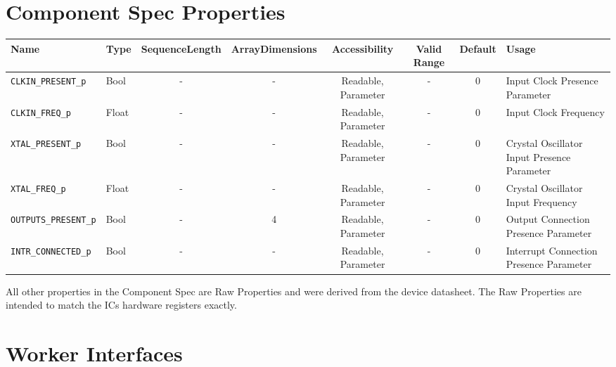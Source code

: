 \documentclass{article}
\begin{document}
\begin{landscape}
\section*{Component Spec Properties}
	\begin{scriptsize}
		\begin{tabular}{|p{3cm}|p{1.5cm}|c|c|c|c|c|p{7cm}|}
			\hline
			\rowcolor{blue}
			Name                   	& Type  & SequenceLength & ArrayDimensions & Accessibility       & Valid Range & Default & Usage                        				\\
			\hline
			\verb+CLKIN_PRESENT_p+ 	& Bool 	& -              & -               & Readable, Parameter & -           & 0       & Input Clock Presence Parameter				\\
			\hline
			\verb+CLKIN_FREQ_p+    	& Float & -              & -               & Readable, Parameter & -           & 0       & Input Clock Frequency						\\
			\hline
			\verb+XTAL_PRESENT_p+  	& Bool  & -              & -               & Readable, Parameter & -           & 0       & Crystal Oscillator Input Presence Parameter	\\
			\hline
			\verb+XTAL_FREQ_p+     	& Float	& -              & -               & Readable, Parameter & -           & 0       & Crystal Oscillator Input Frequency			\\
			\hline
			\verb+OUTPUTS_PRESENT_p+& Bool 	& -              & 4               & Readable, Parameter & -           & 0       & Output Connection Presence Parameter			\\
			\hline
			\verb+INTR_CONNECTED_p+ & Bool 	& -              & -               & Readable, Parameter & -           & 0       & Interrupt Connection Presence Parameter		\\
			\hline
		\end{tabular}
	\end{scriptsize}
	\par\medskip\noindent All other properties in the Component Spec are Raw Properties and were derived from the device datasheet\cite{datasheet}. The Raw Properties are intended to match the ICs hardware registers exactly.
	\section*{Worker Interfaces}

\end{landscape}
\end{document}
